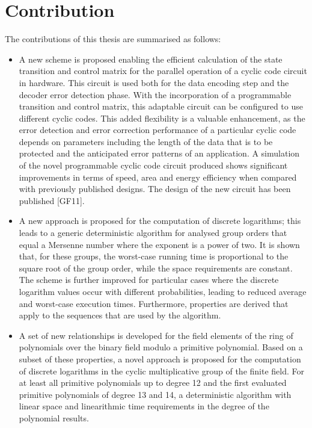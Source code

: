 \documentclass[oneside, a4paper, 11pt]{memoir}
\begin{document}
\section{Contribution}
The contributions of this thesis are summarised as follows:

\begin{itemize}
\item A new scheme is proposed enabling the efficient calculation of the state transition and control matrix for the parallel operation of a cyclic code circuit in hardware. This circuit is used both for the data encoding step and the decoder error detection phase. With the incorporation of a programmable transition and control matrix, this adaptable circuit can be configured to use different cyclic codes. This added flexibility is a valuable enhancement, as the error detection and error correction performance of a particular cyclic code depends on parameters including the length of the data that is to be protected and the anticipated error patterns of an application. A simulation of the novel programmable cyclic code circuit produced shows significant improvements in terms of speed, area and energy efficiency when compared with previously published designs. The design of the new circuit has been published [GF11].
\item A new approach is proposed for the computation of discrete logarithms; this leads to a generic deterministic algorithm for analysed group orders that equal a Mersenne number where the exponent is a power of two. It is shown that, for these groups, the worst-case running time is proportional to the square root of the group order, while the space requirements are constant. The scheme is further improved for particular cases where the discrete logarithm values occur with different probabilities, leading to reduced average and worst-case execution times. Furthermore, properties are derived that apply to the sequences that are used by the algorithm.
\item A set of new relationships is developed for the field elements of the ring of polynomials over the binary field modulo a primitive polynomial. Based on a subset of these properties, a novel approach is proposed for the computation of discrete logarithms in the cyclic multiplicative group of the finite field. For at least all primitive polynomials up to degree 12 and the first evaluated primitive polynomials of degree 13 and 14, a deterministic algorithm with linear space and linearithmic time requirements in the degree of the polynomial results.
\end{itemize}
\end{document}
